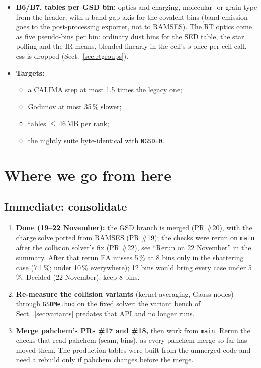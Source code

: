 \documentclass[11pt,a4paper]{article}
\begin{document}
\begin{itemize}
\item \textbf{B6/B7, tables per GSD bin:} optics and charging, molecular- or grain-type from the header, with a
  band-gap axis for the covalent bins (band emission goes to the post-processing exporter, not to RAMSES).
  The RT optics come as five pseudo-bins per bin: ordinary dust bins for the SED table, the star polling and the IR
  means, blended linearly in the cell's $s$ once per cell-call. css is dropped (Sect.~\ref{sec:rtgroups}).
\item \textbf{Targets:}
  \begin{itemize}
  \item a CALIMA step at most 1.5 times the legacy one;
  \item Godunov at most 35\,\% slower;
  \item tables $\le$\,46\,MB per rank;
  \item the nightly suite byte-identical with \texttt{NGSD=0}.
  \end{itemize}
\end{itemize}

\section{Where we go from here}\label{sec:next}

\subsection{Immediate: consolidate}
\begin{enumerate}
\item \textbf{Done (19--22 November):} the GSD branch is merged (PR \#20), with the charge solve ported from RAMSES
  (PR \#19); the checks were rerun on \texttt{main} after the collision solver's fix (PR \#22), see ``Rerun on 22
  November'' in the summary. After that rerun EA misses 5\,\% at 8 bins only in the shattering case (7.1\,\%; under
  10\,\% everywhere); 12 bins would bring every case under 5\,\%. Decided (22 November): keep 8 bins.
\item \textbf{Re-measure the collision variants} (kernel averaging, Gauss nodes) through \texttt{GSDMethod} on the fixed
  solver: the variant bench of Sect.~\ref{sec:variants} predates that API and no longer runs.
\item \textbf{Merge pahchem's PRs \#17 and \#18,} then work from \texttt{main}. Rerun the checks that read
  pahchem (seam, bins), as every pahchem merge so far has moved them. The production tables were built from the
  unmerged code and need a rebuild only if pahchem changes before the merge.
\end{enumerate}
\end{document}
